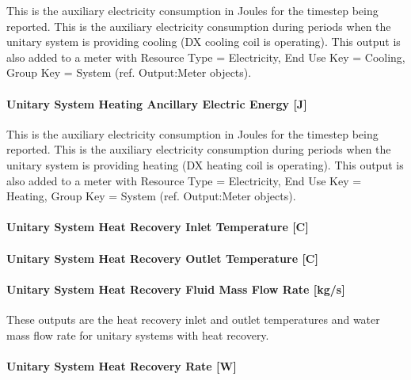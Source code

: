 This is the auxiliary electricity consumption in Joules for the timestep being reported. This is the auxiliary electricity consumption during periods when the unitary system is providing cooling (DX cooling coil is operating). This output is also added to a meter with Resource Type = Electricity, End Use Key = Cooling, Group Key = System (ref. Output:Meter objects).

\paragraph{Unitary System Heating Ancillary Electric Energy {[}J{]}}\label{unitary-system-heating-ancillary-electric-energy-j}

This is the auxiliary electricity consumption in Joules for the timestep being reported. This is the auxiliary electricity consumption during periods when the unitary system is providing heating (DX heating coil is operating). This output is also added to a meter with Resource Type = Electricity, End Use Key = Heating, Group Key = System (ref. Output:Meter objects).

\paragraph{Unitary System Heat Recovery Inlet Temperature {[}C{]}}\label{unitary-system-heat-recovery-inlet-temperature-c}

\paragraph{Unitary System Heat Recovery Outlet Temperature {[}C{]}}\label{unitary-system-heat-recovery-outlet-temperature-c}

\paragraph{Unitary System Heat Recovery Fluid Mass Flow Rate {[}kg/s{]}}\label{unitary-system-heat-recovery-fluid-mass-flow-rate-kgs}

These outputs are the heat recovery inlet and outlet temperatures and water mass flow rate for unitary systems with heat recovery.

\paragraph{Unitary System Heat Recovery Rate {[}W{]}}\label{unitary-system-heat-recovery-rate-w}

